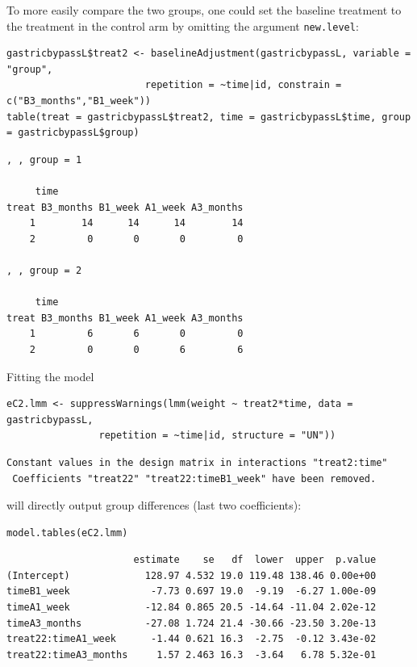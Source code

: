 \documentclass[12pt]{article}
\begin{document}
To more easily compare the two groups, one could set the baseline
treatment to the treatment in the control arm by omitting the argument
\texttt{new.level}:
\lstset{language=r,label= ,caption= ,captionpos=b,numbers=none}
\begin{lstlisting}
gastricbypassL$treat2 <- baselineAdjustment(gastricbypassL, variable = "group",
					    repetition = ~time|id, constrain = c("B3_months","B1_week"))
table(treat = gastricbypassL$treat2, time = gastricbypassL$time, group = gastricbypassL$group)
\end{lstlisting}

\begin{verbatim}
, , group = 1

     time
treat B3_months B1_week A1_week A3_months
    1        14      14      14        14
    2         0       0       0         0

, , group = 2

     time
treat B3_months B1_week A1_week A3_months
    1         6       6       0         0
    2         0       0       6         6
\end{verbatim}

Fitting the model
\lstset{language=r,label= ,caption= ,captionpos=b,numbers=none}
\begin{lstlisting}
eC2.lmm <- suppressWarnings(lmm(weight ~ treat2*time, data = gastricbypassL,
				repetition = ~time|id, structure = "UN"))
\end{lstlisting}

\begin{verbatim}
Constant values in the design matrix in interactions "treat2:time"
 Coefficients "treat22" "treat22:timeB1_week" have been removed.
\end{verbatim}


will directly output group differences (last two coefficients):
\lstset{language=r,label= ,caption= ,captionpos=b,numbers=none}
\begin{lstlisting}
model.tables(eC2.lmm)
\end{lstlisting}
\begin{verbatim}
                      estimate    se   df  lower  upper  p.value
(Intercept)             128.97 4.532 19.0 119.48 138.46 0.00e+00
timeB1_week              -7.73 0.697 19.0  -9.19  -6.27 1.00e-09
timeA1_week             -12.84 0.865 20.5 -14.64 -11.04 2.02e-12
timeA3_months           -27.08 1.724 21.4 -30.66 -23.50 3.20e-13
treat22:timeA1_week      -1.44 0.621 16.3  -2.75  -0.12 3.43e-02
treat22:timeA3_months     1.57 2.463 16.3  -3.64   6.78 5.32e-01
\end{verbatim}
\end{document}
